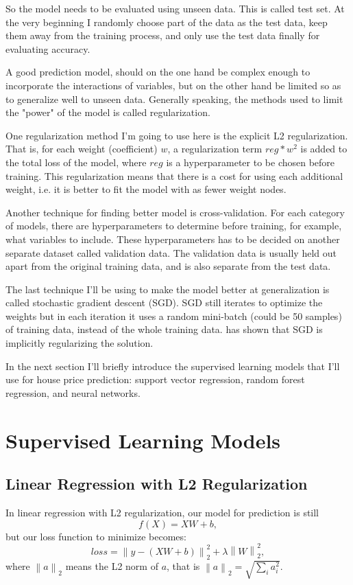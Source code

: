 \documentclass[a4paper]{article}
\newcommand{\norm}[1]{\left\lVert#1\right\rVert}
\begin{document}
So the model needs to be evaluated using unseen data. This is called test set. At the very beginning I randomly choose part of the data as the test data, keep them away from the training process, and only use the test data finally for evaluating accuracy.

A good prediction model, should on the one hand be complex enough to incorporate the interactions of variables, but on the other hand be limited so as to generalize well to unseen data. Generally speaking, the methods used to limit the "power" of the model is called regularization.

One regularization method I'm going to use here is the explicit L2 regularization. That is, for each weight (coefficient) $w$, a regularization term $reg * w^2$ is added to the total loss of the model, where $reg$ is a hyperparameter to be chosen before training. This regularization means that there is a cost for using each additional weight, i.e. it is better to fit the model with as fewer weight nodes.

Another technique for finding better model is cross-validation. For each category of models, there are hyperparameters to determine before training, for example, what variables to include. These hyperparameters has to be decided on another separate dataset called validation data. The validation data is usually held out apart from the original training data, and is also separate from the test data. 

The last technique I'll be using to make the model better at generalization is called stochastic gradient descent (SGD). SGD still iterates to optimize the weights but in each iteration it uses a random mini-batch (could be 50 samples) of training data, instead of the whole training data. \cite{zhang2016understanding} has shown that SGD is implicitly regularizing the solution. 

In the next section I'll briefly introduce the supervised learning models that I'll use for house price prediction: support vector regression, random forest regression, and neural networks.

\section{Supervised Learning Models}

\subsection{Linear Regression with L2 Regularization}
In linear regression with L2 regularization, our model for prediction is still
\begin{equation}
  f(X) = XW + b,
\end{equation}
but our loss function to minimize becomes:
\begin{equation}
  loss = \norm{y - (XW+b)}^2_2 + \lambda \norm{W}^2_2,
\end{equation}
where $\norm{a}_2$ means the L2 norm of $a$, that is $\norm{a}_2 = \sqrt{\sum_i a_i^2}$.
\end{document}
